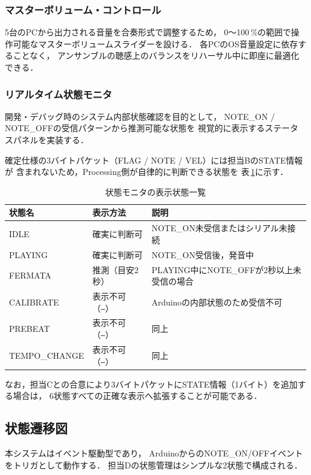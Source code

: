 \documentclass[lualatex,book,paper=a4paper,jafontsize=11.5pt,jafontscale=1.05,oneside]{jlreq}
\begin{document}
\subsubsection{マスターボリューム・コントロール}
5台のPCから出力される音量を合奏形式で調整するため，
0〜100\,\%の範囲で操作可能なマスターボリュームスライダーを設ける．
各PCのOS音量設定に依存することなく，
アンサンブルの聴感上のバランスをリハーサル中に即座に最適化できる．

\subsubsection{リアルタイム状態モニタ}
開発・デバッグ時のシステム内部状態確認を目的として，
NOTE\_ON / NOTE\_OFFの受信パターンから推測可能な状態を
視覚的に表示するステータスパネルを実装する．

確定仕様の3バイトパケット（FLAG / NOTE / VEL）には担当BのSTATE情報が
含まれないため，Processing側が自律的に判断できる状態を
表\,\ref{tab:states}に示す．

\begin{table}[h]
  \centering
  \caption{状態モニタの表示状態一覧}
  \label{tab:states}
  \begin{tabular}{lll}
    \hline
    状態名 & 表示方法 & 説明 \\
    \hline
    IDLE          & 確実に判断可 & NOTE\_ON未受信またはシリアル未接続 \\
    PLAYING       & 確実に判断可 & NOTE\_ON受信後，発音中 \\
    FERMATA       & 推測（目安2秒） & PLAYING中にNOTE\_OFFが2秒以上未受信の場合 \\
    CALIBRATE     & 表示不可（\texttt{—}） & Arduinoの内部状態のため受信不可 \\
    PREBEAT       & 表示不可（\texttt{—}） & 同上 \\
    TEMPO\_CHANGE & 表示不可（\texttt{—}） & 同上 \\
    \hline
  \end{tabular}
\end{table}

なお，担当Cとの合意により3バイトパケットにSTATE情報（1バイト）を追加する場合は，
6状態すべての正確な表示へ拡張することが可能である．

\subsection{状態遷移図}
本システムはイベント駆動型であり，
ArduinoからのNOTE\_ON/OFFイベントをトリガとして動作する．
担当Dの状態管理はシンプルな2状態で構成される．
\end{document}
